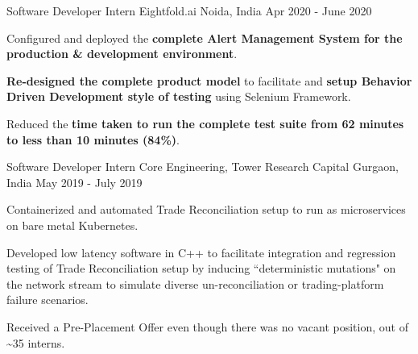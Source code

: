 \begin{cventries}

  \cventry
    {Software Developer Intern} %
    {Eightfold.ai} %
    {Noida, India} %
    {Apr 2020 - June 2020} %
    {
      \begin{cvitems} %
        \item {Configured and deployed the \textbf{complete Alert Management System for the production \& development environment}.}
        \item {\textbf{Re-designed the complete product model} to facilitate and \textbf{setup Behavior Driven Development style of testing} using Selenium Framework.}
        \item {Reduced the \textbf{time taken to run the complete test suite from 62 minutes to less than 10 minutes (84\%)}.}
      \end{cvitems}
    }


  \cventry
    {Software Developer Intern} %
    {Core Engineering, Tower Research Capital} %
    {Gurgaon, India} %
    {May 2019 - July 2019} %
    {
      \begin{cvitems} %
        \item {Containerized and automated Trade Reconciliation setup to run as microservices on bare metal Kubernetes.}
        \item {Developed low latency software in C++ to facilitate integration and regression testing of Trade Reconciliation setup by inducing ``deterministic mutations" on the network stream to simulate diverse un-reconciliation or trading-platform failure scenarios.}
        \item {Received a Pre-Placement Offer even though there was no vacant position, out of \textasciitilde 35 interns.}
      \end{cvitems}
    }


\end{cventries}

